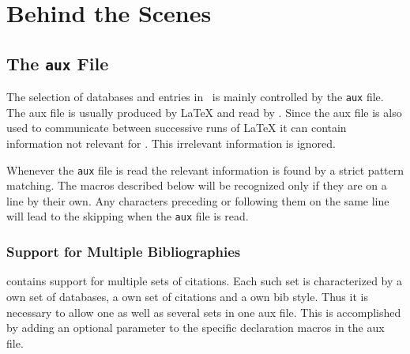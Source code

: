 
\chapter{Behind the Scenes}

\section{The \texttt{aux} File}


 The selection of databases and entries in \ExBib\ is mainly
controlled by the \texttt{aux} file. The aux file is usually produced
by \LaTeX{} and read by \ExBib. Since the aux file
is also used to communicate between successive runs of
\LaTeX{} it can contain information not relevant for
\ExBib. This irrelevant information is ignored.

Whenever the \texttt{aux} file is read the relevant information is
found by a strict pattern matching. The macros described below will be
recognized only if they are on a line by their own. Any characters
preceding or following them on the same line will lead to the
skipping when the \texttt{aux} file is read.

\subsection{Support for Multiple Bibliographies}

\ExBib{} contains support for multiple sets of citations. Each
such set is characterized by a own set of databases, a own set of
citations and a own bib style. Thus it is necessary to allow one as
well as several sets in one aux file. This is accomplished by adding
an optional parameter to the specific declaration macros in the aux
file.

